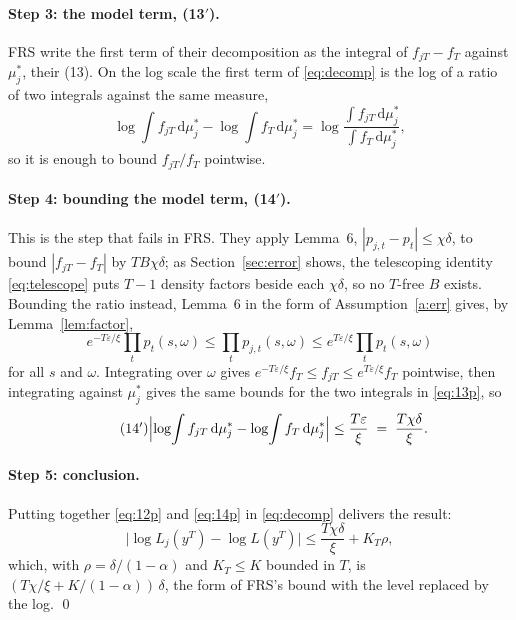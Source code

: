 \documentclass[11pt]{article}
\theoremstyle{definition}
\theoremstyle{remark}
\newcommand{\dd}{\mathrm{d}}
\begin{document}
\paragraph{Step 3: the model term, (13$'$).} FRS write the first term of their decomposition as
the integral of $f_{jT} - f_T$ against $\mu_j^*$, their (13). On the log scale the first term
of \eqref{eq:decomp} is the log of a ratio of two integrals against the same measure,
\begin{equation}\tag{13$'$}\label{eq:13p}
  \log\!\int f_{jT}\,\dd\mu_j^* - \log\!\int f_T\,\dd\mu_j^*
  = \log \frac{\int f_{jT}\,\dd\mu_j^*}{\int f_T\,\dd\mu_j^*} ,
\end{equation}
so it is enough to bound $f_{jT}/f_T$ pointwise.

\paragraph{Step 4: bounding the model term, (14$'$).} This is the step that fails in FRS. They
apply Lemma~6, $|p_{j,t} - p_t| \le \chi\delta$, to bound $|f_{jT} - f_T|$ by $TB\chi\delta$; as
Section~\ref{sec:error} shows, the telescoping identity \eqref{eq:telescope} puts $T-1$ density
factors beside each $\chi\delta$, so no $T$-free $B$ exists. Bounding the ratio instead, Lemma~6
in the form of Assumption~\ref{a:err} gives, by Lemma~\ref{lem:factor},
\[
  e^{-T\varepsilon/\xi}\prod_t p_t(s,\omega) \le \prod_t p_{j,t}(s,\omega)
  \le e^{T\varepsilon/\xi}\prod_t p_t(s,\omega)
\]
for all $s$ and $\omega$. Integrating over $\omega$ gives
$e^{-T\varepsilon/\xi}f_T \le f_{jT} \le e^{T\varepsilon/\xi}f_T$ pointwise, then integrating
against $\mu_j^*$ gives the same bounds for the two integrals in \eqref{eq:13p}, so
\begin{equation}\tag{14$'$}\label{eq:14p}
  \Bigl|\log\!\int f_{jT}\,\dd\mu_j^* - \log\!\int f_T\,\dd\mu_j^*\Bigr| \le
  \frac{T\varepsilon}{\xi} \;=\; \frac{T\chi\delta}{\xi} .
\end{equation}

\paragraph{Step 5: conclusion.} Putting together \eqref{eq:12p} and \eqref{eq:14p} in
\eqref{eq:decomp} delivers the result:
\[
  \bigl|\log L_j(y^T) - \log L(y^T)\bigr| \le \frac{T\chi\delta}{\xi} + K_T\rho ,
\]
which, with $\rho = \delta/(1-\alpha)$ and $K_T \le K$ bounded in $T$, is
$(T\chi/\xi + K/(1-\alpha))\,\delta$, the form of FRS's bound with the level replaced by the log.
\qed
\end{document}
